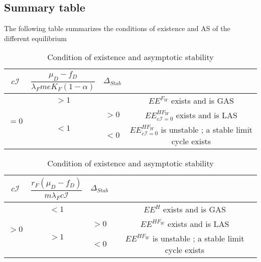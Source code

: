 \documentclass{article}
\newcommand{\lfw}{\lambda_{F}}
\newcommand{\lfw}{\lambda_{F}}
\begin{document}
\subsection{Summary table}
The following table summarizes the conditions of existence and AS of the different equilibrium

\begin{table}[!ht]
\centering
\def\arraystretch{2}
\begin{tabular}{c|c|c|c}
$c\mathcal{I}$ & $\dfrac{\mu_D - f_D}{\lfw m e K_F(1-\alpha)}$ &  $\Delta_{Stab}$ & \\
\hline
\multirow{3}{*}{$=0$} & $ > 1$ & &$EE^{F_W}$ exists and is GAS  \\
\cline{2-4}
 & \multirow{2}{*}{$< 1$} & $>0$ &$EE^{HF_W}_{c\mathcal{I}=0}$ exists and is LAS\\
 \cline{3-4}
 & & $ < 0$ &$EE^{HF_W}_{c\mathcal{I}=0}$ is unstable ; a stable limit cycle exists
\end{tabular}
\newline
\vspace{0.5cm}
\newline
\begin{tabular}{c|c|c|c}
$c\mathcal{I}$ & $\dfrac{r_F(\mu_D-f_D)}{m\lfw c\mathcal{I}} $ & $\Delta_{Stab}$ & \\
\hline
\multirow{3}{*}{$>0$} & $<1$ & &$EE^{H}$ exists and is GAS \\
\cline{2-4}
 & \multirow{2}{*}{$> 1$}  & $>0$ &$EE^{HF_W}$ exists and is LAS\\
 \cline{3-4}
 & & $ < 0$ & $EE^{HF_W}$ is unstable ; a stable limit cycle exists \\
\end{tabular}
\caption{Condition of existence and asymptotic stability}
\end{table}



%
%
%
%
\end{document}
